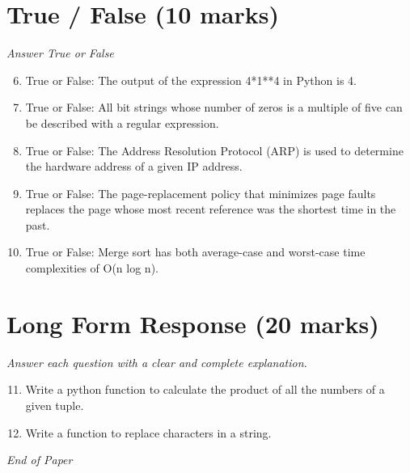 \documentclass[12pt]{article}
\begin{document}
\section*{True / False (10 marks)}
\textit{Answer True or False}
\begin{enumerate}[label=\arabic*.]
\setcounter{enumi}{5}
\item True or False: The output of the expression 4*1**4 in Python is 4.
\item True or False: All bit strings whose number of zeros is a multiple of five can be described with a regular expression.
\item True or False: The Address Resolution Protocol (ARP) is used to determine the hardware address of a given IP address.
\item True or False: The page-replacement policy that minimizes page faults replaces the page whose most recent reference was the shortest time in the past.
\item True or False: Merge sort has both average-case and worst-case time complexities of O(n log n).
\end{enumerate}

\section*{Long Form Response (20 marks)}
\textit{Answer each question with a clear and complete explanation.}
\begin{enumerate}[label=\arabic*.]
\setcounter{enumi}{10}
\item Write a python function to calculate the product of all the numbers of a given tuple.
\item Write a function to replace characters in a string.
\end{enumerate}

\vfill
\noindent\textit{End of Paper}
\end{document}
